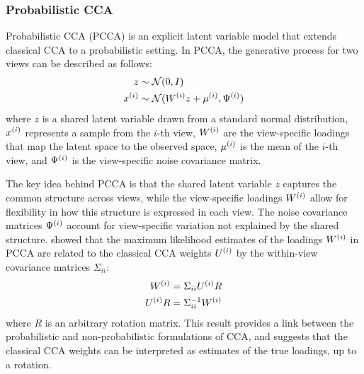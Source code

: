 \subsubsection{Probabilistic CCA}
Probabilistic CCA (PCCA) is an explicit latent variable model that extends classical CCA to a probabilistic setting. In PCCA, the generative process for two views can be described as follows:
\begin{align}
z &\sim \mathcal{N}(0, I)\\
x^{(i)} &\sim \mathcal{N}(W^{(i)} z + \mu^{(i)}, \Psi^{(i)})
\end{align}
where $z$ is a shared latent variable drawn from a standard normal distribution, $x^{(i)}$ represents a sample from the $i$-th view, $W^{(i)}$ are the view-specific loadings that map the latent space to the observed space, $\mu^{(i)}$ is the mean of the $i$-th view, and $\Psi^{(i)}$ is the view-specific noise covariance matrix.

The key idea behind PCCA is that the shared latent variable $z$ captures the common structure across views, while the view-specific loadings $W^{(i)}$ allow for flexibility in how this structure is expressed in each view. The noise covariance matrices $\Psi^{(i)}$ account for view-specific variation not explained by the shared structure.
\citet{bach2005probabilistic} showed that the maximum likelihood estimates of the loadings $W^{(i)}$ in PCCA are related to the classical CCA weights $U^{(i)}$ by the within-view covariance matrices $\Sigma_{ii}$:
\begin{align}\label{eq:weights-to-loadings}
W^{(i)} &= \Sigma_{ii} U^{(i)} R\\
U^{(i)} R &= \Sigma_{ii}^{-1} W^{(i)}
\end{align}
where $R$ is an arbitrary rotation matrix. This result provides a link between the probabilistic and non-probabilistic formulations of CCA, and suggests that the classical CCA weights can be interpreted as estimates of the true loadings, up to a rotation.

